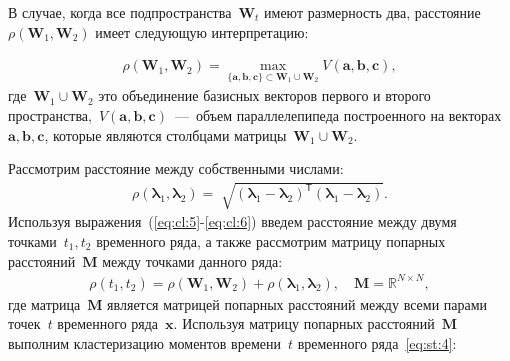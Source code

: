 В случае, когда все подпространства~$\textbf{W}_t$ имеют размерность два, расстояние~$\rho\left(\textbf{W}_1, \textbf{W}_2\right)$ имеет следующую интерпретацию:

\begin{equation}
\label{eq:cl:5}
\begin{aligned}
\rho\left(\textbf{W}_1, \textbf{W}_2\right) = \max_{\{\textbf{a},\textbf{b},\textbf{c}\} \subset \textbf{W}_1\cup \textbf{W}_2 } V\left(\textbf{a},\textbf{b},\textbf{c}\right), 
\end{aligned}
\end{equation}
где~$\textbf{W}_1\cup\textbf{W}_2$ это объединение базисных векторов первого и второго пространства,~$V\left(\textbf{a},\textbf{b},\textbf{c}\right)$~---~объем параллелепипеда построенного на векторах~$\textbf{a}, \textbf{b}, \textbf{c}$, которые являются столбцами матрицы~$\textbf{W}_1\cup\textbf{W}_2$.


Рассмотрим расстояние между собственными числами:
\begin{equation}
\label{eq:cl:6}
\begin{aligned}
\rho\left(\bm{\lambda}_1, \bm{\lambda}_2\right) = \sqrt[]{\left(\bm{\lambda}_1 - \bm{\lambda}_2\right)^{\mathsf{T}}\left(\bm{\lambda}_1 - \bm{\lambda}_2\right)}.
\end{aligned}
\end{equation}
Используя выражения~(\ref{eq:cl:5}-\ref{eq:cl:6}) введем расстояние между двумя точками~$t_1, t_2$ временного ряда, а также рассмотрим матрицу попарных расстояний~$\textbf{M}$ между точками данного ряда:
\begin{equation}
\label{eq:cl:9}
\begin{aligned}
\rho\left(t_1, t_2\right) = \rho\left(\textbf{W}_1, \textbf{W}_2\right) + \rho\left(\bm{\lambda}_1, \bm{\lambda}_2\right), \quad \textbf{M} =  \mathbb{R}^{N\times N},
\end{aligned}
\end{equation}
где %
матрица~$\textbf{M}$ является матрицей попарных расстояний между всеми парами точек~$t$ временного ряда~$\textbf{x}$.
Используя матрицу попарных расстояний~$\textbf{M}$ выполним кластеризацию моментов времени~$t$ временного ряда~\eqref{eq:st:4}:

